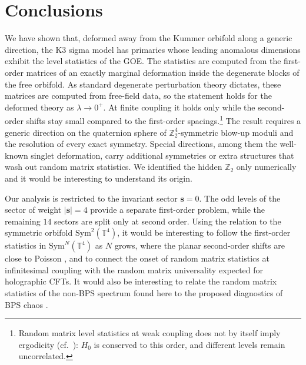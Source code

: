 \documentclass[aps,twocolumn,preprintnumbers,groupedaddress,nofootinbib,prl]{revtex4-2}
\newcommand{\Sym}{\mathrm{Sym}}
\newcommand{\Tf}{\mathbb T^4}
\newcommand{\lam}{\lambda}
\newcommand{\bs}{\mathbf s}
\begin{document}
\section{Conclusions}
\label{sec:conclusion}

We have shown that, deformed away from the Kummer orbifold along a generic direction, the K3 sigma model has primaries whose leading anomalous dimensions exhibit the level statistics of the GOE. The statistics are computed from the first-order matrices of an exactly marginal deformation inside the degenerate blocks of the free orbifold. As standard degenerate perturbation theory dictates, these matrices are computed from free-field data, so the statement holds for the deformed theory as $\lam\to0^+$. At finite coupling it holds only while the second-order shifts stay small compared to the first-order spacings.\footnote{Random matrix level statistics at weak coupling does not by itself imply ergodicity (cf.\ \cite{Abdelshafy:2025ddx}): $H_0$ is conserved to this order, and different levels remain uncorrelated.} The result requires a generic direction on the quaternion sphere of $\mathbb Z_2^4$-symmetric blow-up moduli and the resolution of every exact symmetry. Special directions, among them the well-known singlet deformation, carry additional symmetries or extra structures that wash out random matrix statistics. We identified the hidden $\mathbb Z_2$ only numerically and it would be interesting to understand its origin.

Our analysis is restricted to the invariant sector $\bs=0$. The odd levels of the sector of weight $|\bs|=4$ provide a separate first-order problem, while the remaining $14$ sectors are split only at second order. Using the relation to the symmetric orbifold $\Sym^2(\Tf)$, it would be interesting to follow the first-order statistics in $\Sym^N(\Tf)$ as $N$ grows, where the planar second-order shifts are close to Poisson \cite{Zhang:2026jnf,Gaberdiel:2026jor}, and to connect the onset of random matrix statistics at infinitesimal coupling with the random matrix universality expected for holographic CFTs. It would also be interesting to relate the random matrix statistics of the non-BPS spectrum found here to the proposed diagnostics of BPS chaos \cite{Chen:2024oqv,Chen:2026vml,Belin:2026vfd}.
\end{document}
